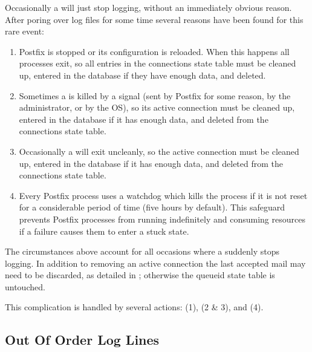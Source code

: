 \label{smtpd stops logging}

Occasionally a  will just stop logging, without an
immediately obvious reason.  After poring over log files for some time
several reasons have been found for this rare event:

\begin{enumerate}

    \item Postfix is stopped or its configuration is reloaded.  When this
        happens all  processes exit, so all entries in the
        connections state table must be cleaned up, entered in the database
        if they have enough data, and deleted.

    \item Sometimes a  is killed by a signal (sent by Postfix
        for some reason, by the administrator, or by the OS), so its active
        connection must be cleaned up, entered in the database if it has
        enough data, and deleted from the connections state table.

    \item Occasionally a  will exit uncleanly, so the active
        connection must be cleaned up, entered in the database if it has
        enough data, and deleted from the connections state table.

    \item Every Postfix process uses a watchdog which kills the process if
        it is not reset for a considerable period of time (five hours by
        default).  This safeguard prevents Postfix processes from running
        indefinitely and consuming resources if a failure causes them to
        enter a stuck state.

\end{enumerate}

The circumstances above account for all occasions where a 
suddenly stops logging.  In addition to removing an active connection the
last accepted mail may need to be discarded, as detailed in
; otherwise the queueid state table
is untouched.

This complication is handled by several actions:  (1),
 (2 \& 3), and  (4).


\subsection{Out Of Order Log Lines}

